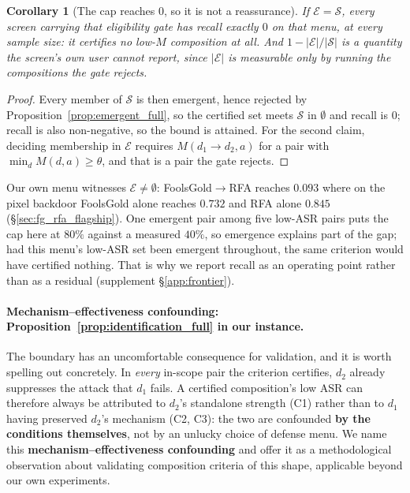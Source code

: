 \documentclass{article}
\newtheorem{corollary}{Corollary}
\begin{document}
\begin{corollary}[The cap reaches $0$, so it is not a reassurance]
\label{cor:zero_recall}
If $\mathcal{E} = \mathcal{S}$, every screen carrying that eligibility gate has recall exactly $0$ on that menu, at every sample size: it certifies no low-$M$ composition at all. And $1 - |\mathcal{E}|/|\mathcal{S}|$ is a quantity the screen's own user cannot report, since $|\mathcal{E}|$ is measurable only by running the compositions the gate rejects.
\end{corollary}
\begin{proof}
Every member of $\mathcal{S}$ is then emergent, hence rejected by Proposition~\ref{prop:emergent_full}, so the certified set meets $\mathcal{S}$ in $\emptyset$ and recall is $0$; recall is also non-negative, so the bound is attained. For the second claim, deciding membership in $\mathcal{E}$ requires $M(d_1 \to d_2, a)$ for a pair with $\min_{d}M(d,a) \ge \theta$, and that is a pair the gate rejects.
\end{proof}

\noindent Our own menu witnesses $\mathcal{E} \neq \emptyset$: FoolsGold$\to$RFA reaches $0.093$ where on the pixel backdoor FoolsGold alone reaches $0.732$ and RFA alone $0.845$ (§\ref{sec:fg_rfa_flagship}). One emergent pair among five low-ASR pairs puts the cap here at $80\%$ against a measured $40\%$, so emergence explains part of the gap; had this menu's low-ASR set been emergent throughout, the same criterion would have certified nothing. That is why we report recall as an operating point rather than as a residual (supplement §\ref{app:frontier}).

\paragraph{Mechanism--effectiveness confounding: Proposition~\ref{prop:identification_full} in our instance.} The boundary has an uncomfortable consequence for validation, and it is worth spelling out concretely. In \emph{every} in-scope pair the criterion certifies, $d_2$ already suppresses the attack that $d_1$ fails. A certified composition's low ASR can therefore always be attributed to $d_2$'s standalone strength (C1) rather than to $d_1$ having preserved $d_2$'s mechanism (C2, C3): the two are confounded \textbf{by the conditions themselves}, not by an unlucky choice of defense menu. We name this \textbf{mechanism--effectiveness confounding} and offer it as a methodological observation about validating composition criteria of this shape, applicable beyond our own experiments.
\end{document}
